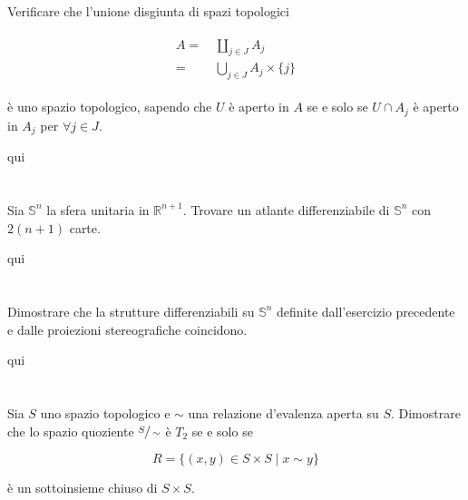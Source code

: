 \begin{tcolorbox}
	Verificare che l'unione disgiunta di spazi topologici
	
	\begin{align}
		\begin{split}
			A =& \, \coprod_{j \in J} A_{j}\\
			=& \, \bigcup_{j \in J} A_{j} \times \{j\}
		\end{split}
	\end{align}
	
	è uno spazio topologico, sapendo che $ U $ è aperto in $ A $ se e solo se $ U \cap A_{j} $ è aperto in $ A_{j} $ per $ \forall j \in J $.
\end{tcolorbox}

qui

\section{}\label{es2-1}

\begin{tcolorbox}
	Sia $ \mathbb{S}^{n} $ la sfera unitaria in $ \mathbb{R}^{n+1} $. Trovare un atlante differenziabile di $ \mathbb{S}^{n} $ con $ 2(n+1) $ carte.

\end{tcolorbox}

qui

\section{}\label{es2-2}

\begin{tcolorbox}
	Dimostrare che la strutture differenziabili su $ \mathbb{S}^{n} $ definite dall’esercizio precedente e dalle proiezioni
	stereografiche coincidono.
\end{tcolorbox}

qui

\section{}\label{es2-3}

\begin{tcolorbox}
	Sia $ S $ uno spazio topologico e $ \sim $ una relazione d'evalenza aperta su $ S $. Dimostrare che lo spazio quoziente $ \sfrac{S}{\sim} $ è $ T_{2} $ se e solo se
	
	\begin{equation}
		R = \{ (x,y) \in S \times S \mid x \sim y \}
	\end{equation}
	
	è un sottoinsieme chiuso di $ S \times S $.
\end{tcolorbox}

